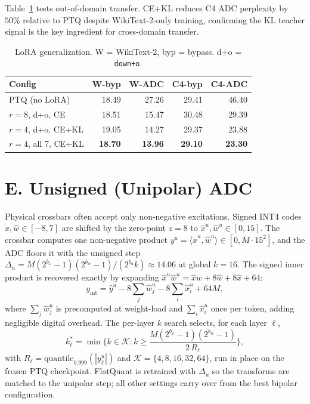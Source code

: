 \documentclass[letterpaper]{article} %
\theoremstyle{plain}
\begin{document}
Table~\ref{tab:lorav8} tests out-of-domain transfer. CE+KL reduces C4 ADC perplexity by $50\%$ relative to PTQ despite WikiText-2-only training, confirming the KL teacher signal is the key ingredient for cross-domain transfer.

\begin{table}[htbp]
\centering
\setlength{\tabcolsep}{3pt}
\begin{tabular}{@{}lrrrr@{}}
\toprule
\textbf{Config} & \textbf{W-byp} & \textbf{W-ADC} & \textbf{C4-byp} & \textbf{C4-ADC} \\
\midrule
PTQ (no LoRA)              & 18.49 & 27.26 & 29.41 & 46.40 \\
$r{=}8$, d+o, CE           & 18.51 & 15.47 & 30.48 & 29.39 \\
$r{=}4$, d+o, CE+KL        & 19.05 & 14.27 & 29.37 & 23.88 \\
$r{=}4$, all 7, CE+KL      & \textbf{18.70} & \textbf{13.96} & \textbf{29.10} & \textbf{23.30} \\
\bottomrule
\end{tabular}
\caption{LoRA generalization. W = WikiText-2, byp = bypass. d+o = \texttt{down+o}.}
\label{tab:lorav8}
\end{table}

\section{E. Unsigned (Unipolar) ADC}

Physical crossbars often accept only non-negative excitations. Signed INT4 codes $\hat{x},\hat{w}\in[-8,7]$ are shifted by the zero-point $z = 8$ to $\hat{x}^u,\hat{w}^u\in[0,15]$. The crossbar computes one non-negative product $y^u = \langle \hat{x}^u, \hat{w}^u\rangle \in [0, M\cdot 15^2]$, and the ADC floors it with the unsigned step $\Delta_u = M(2^{b_x}-1)(2^{b_w}-1)/(2^{b_a}k) \approx 14.06$ at global $k=16$. The signed inner product is recovered exactly by expanding $\hat{x}^u\hat{w}^u = \hat{x}\hat{w} + 8\hat{w} + 8\hat{x} + 64$:
\begin{equation}
    y_{\mathrm{int}} = \hat{y}^u - 8\!\sum_j \hat{w}^u_j - 8\!\sum_i \hat{x}^u_i + 64M,
\end{equation}
where $\sum_j \hat{w}^u_j$ is precomputed at weight-load and $\sum_i \hat{x}^u_i$ once per token, adding negligible digital overhead. The per-layer $k$ search selects, for each layer $\ell$,
\begin{equation}
    k^*_\ell = \min\!\Big\{ k \in \mathcal{K} : k \ge \frac{M(2^{b_x}-1)(2^{b_w}-1)}{2\,R_\ell} \Big\},
\end{equation}
with $R_\ell = \mathrm{quantile}_{0.999}(|y^u_\ell|)$ and $\mathcal{K} = \{4,8,16,32,64\}$, run in place on the frozen PTQ checkpoint. FlatQuant is retrained with $\Delta_u$ so the transforms are matched to the unipolar step; all other settings carry over from the best bipolar configuration.
\end{document}
